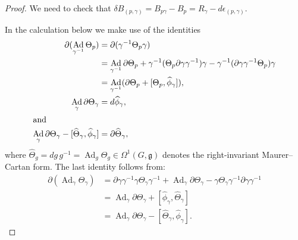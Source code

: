 \documentclass[12pt]{amsart}
\DeclareMathOperator{\Ad}{Ad}
\theoremstyle{plain}
\theoremstyle{definition}
\theoremstyle{remark}
\numberwithin{equation}{section}
\newcommand{\g}{\mathfrak g}
\newcommand{\<}{\langle}
\renewcommand{\>}{\rangle}
\newcommand{\Thetahat}{\widehat{\Theta}}
\newcommand{\phihat}{\widehat{\phi}}
\newcommand{\rMC}[1]{d#1\,#1^{-1}}
\begin{document}
\begin{proof}
We need to check that $\delta B_{(p,\gamma)} = B_{p\gamma} - B_p= R_{\gamma} - d\epsilon_{(p,\gamma)} $. 

In the calculation below we make use of the identities
\begin{align*}
\partial(\Ad_{\gamma^{-1}}\Theta_p) 
	&= \partial(\gamma^{-1}\Theta_p \gamma)\\
	& = \Ad_{\gamma^{-1}}\partial\Theta_p + \gamma^{-1}(\Theta_p\partial\gamma \gamma^{-1})\gamma- \gamma^{-1}(\partial\gamma \gamma^{-1}\Theta_p)\gamma\\
	& = \Ad_{\gamma^{-1}}(\partial\Theta_p + [\Theta_p,\phihat_\gamma]),\\
\Ad_\gamma\partial\Theta_\gamma 
	&= d\phihat_\gamma,\\ 
\intertext{and} 
\Ad_\gamma\partial\Theta_\gamma -[\Thetahat_\gamma,\phihat_\gamma] &= \partial\Thetahat_\gamma,
\end{align*} 
where $\Thetahat_g = \rMC{g} = \Ad_{g} \Theta_g\in \Omega^1(G,\g)$ denotes the right-invariant Maurer--Cartan form. 
The last identity follows from:
\begin{align*}
\partial(\Ad_\gamma\Theta_\gamma) & = \partial\gamma \gamma^{-1}\gamma\Theta_\gamma\gamma^{-1} + \Ad_\gamma\partial\Theta_\gamma - \gamma\Theta_\gamma\gamma^{-1}\partial\gamma\gamma^{-1}\\
&=\Ad_\gamma\partial\Theta_\gamma + [\phihat_\gamma,\Thetahat_\gamma]\\
& = \Ad_\gamma\partial\Theta_\gamma - [\Thetahat_\gamma,\phihat_\gamma].
\end{align*}


\end{proof}
\end{document}
